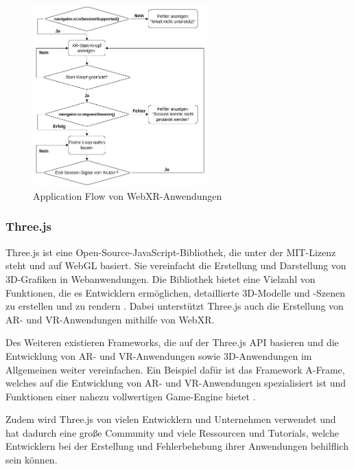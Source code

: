 \begin{figure}[H]
    \centering
    \includegraphics[width=0.6\textwidth]{images/WebXR-App-Flow.png}
    \caption{Application Flow von WebXR-Anwendungen}
    \label{fig:webxr-app-flow}
\end{figure}

\subsubsection{Three.js}

Three.js ist eine Open-Source-JavaScript-Bibliothek, die unter der MIT-Lizenz steht und auf WebGL basiert.
Sie vereinfacht die Erstellung und Darstellung von 3D-Grafiken in Webanwendungen.
Die Bibliothek bietet eine Vielzahl von Funktionen, die es Entwicklern ermöglichen, detaillierte 3D-Modelle und -Szenen zu erstellen und zu rendern \autocite[][]{threejs-docs}.
Dabei unterstützt Three.js auch die Erstellung von AR- und VR-Anwendungen mithilfe von WebXR.

Des Weiteren existieren Frameworks, die auf der Three.js API basieren und die Entwicklung von AR- und VR-Anwendungen sowie 3D-Anwendungen im Allgemeinen weiter vereinfachen. 
Ein Beispiel dafür ist das Framework A-Frame, welches auf die Entwicklung von AR- und VR-Anwendungen spezialisiert ist und Funktionen einer nahezu vollwertigen Game-Engine bietet \autocite[]{a-frame-introduction}.

Zudem wird Three.js von vielen Entwicklern und Unternehmen verwendet und hat dadurch eine große Community und viele Ressourcen und Tutorials, welche Entwicklern bei der Erstellung und Fehlerbehebung ihrer Anwendungen behilflich sein können.

